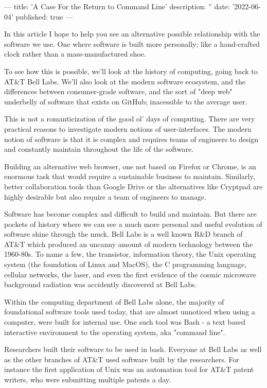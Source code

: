 ---
title: 'A Case For the Return to Command Line'
description: ''
date: '2022-06-04'
published: true
---

In this article I hope to help you see an alternative possible relationship
with the software we use. One where software is built more personally; like a
hand-crafted clock rather than a mass-manufactured shoe.

To see how this is possible, we'll look at the history of computing, going back
to AT&T Bell Labs. We'll also look at the modern software ecosystem, and the
differences between consumer-grade software, and the sort of "deep web" underbelly
of software that exists on GitHub; inacessible to the average user.

This is not a romanticization of the good ol' days of computing. There are very
practical reasons to investigate modern notions of user-interfaces. The modern
notion of software is that it is complex and requires teams of engineers to
design and constantly maintain throughout the life of the software.

Building an alternative web browser, one not based on Firefox or Chrome, is an
enormous task that would require a sustainable business to maintain. Similarly,
better collaboration tools than Google Drive or the alternatives like Cryptpad
are highly desirable but also require a team of engineers to manage.

Software has become complex and difficult to build and maintain. But there are
pockets of history where we can see a much more personal and useful evolution
of software shine through the muck. Bell Labs is a well known R&D branch of
AT&T which produced an uncanny amount of modern technology between the
1960-80s. To name a few, the transistor, information theory, the Unix operating
system (the foundation of Linux and MacOS), the C programming language,
cellular networks, the laser, and even the first evidence of the cosmic
microwave background radiation was accidently discovered at Bell Labs.

Within the computing department of Bell Labs alone, the majority of
foundational software tools used today, that are almost unnoticed when using a
computer, were built for internal use. One such tool was Bash - a text based
interactive environment to the operating system, aka "command line".

Researchers built their software to be used in bash. Everyone at Bell Labs as
well as the other branches of AT&T used software built by the researchers. For
instance the first application of Unix was an automation tool for AT&T patent
writers, who were submitting multiple patents a day.


